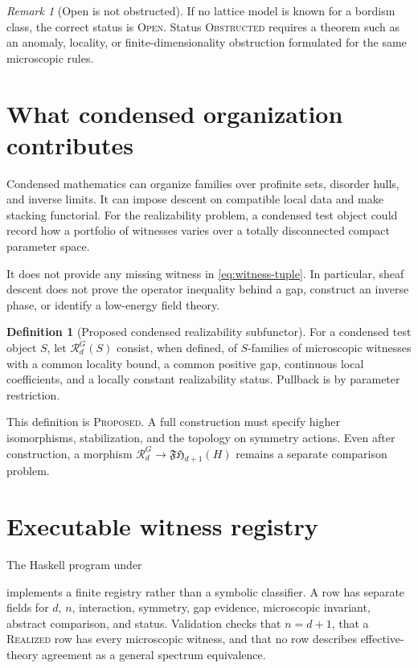 \documentclass[12pt]{article}
\theoremstyle{definition}
\newtheorem{definition}[theorem]{Definition}
\theoremstyle{remark}
\newtheorem{remark}[theorem]{Remark}
\newcommand{\FH}{\mathfrak{FH}}
\newcommand{\REAL}{\textnormal{\textsc{Realized}}}
\newcommand{\PROP}{\textnormal{\textsc{Proposed}}}
\newcommand{\OPEN}{\textnormal{\textsc{Open}}}
\newcommand{\OBST}{\textnormal{\textsc{Obstructed}}}
\begin{document}
\begin{remark}[Open is not obstructed]
If no lattice model is known for a bordism class, the correct status is
\OPEN{}.  Status \OBST{} requires a theorem such as an anomaly, locality, or
finite-dimensionality obstruction formulated for the same microscopic
rules.
\end{remark}

\section{What condensed organization contributes}

Condensed mathematics can organize families over profinite sets, disorder
hulls, and inverse limits.  It can impose descent on compatible local data
and make stacking functorial.  For the realizability problem, a condensed
test object could record how a portfolio of witnesses varies over a totally
disconnected compact parameter space.

It does not provide any missing witness in \cref{eq:witness-tuple}.  In
particular, sheaf descent does not prove the operator inequality behind a
gap, construct an inverse phase, or identify a low-energy field theory.

\begin{definition}[Proposed condensed realizability subfunctor]
For a condensed test object $S$, let $\mathcal R_d^G(S)$ consist, when
defined, of $S$-families of microscopic witnesses with a common locality
bound, a common positive gap, continuous local coefficients, and a locally
constant realizability status.  Pullback is by parameter restriction.
\end{definition}

This definition is \PROP{}.  A full construction must specify higher
isomorphisms, stabilization, and the topology on symmetry actions.  Even
after construction, a morphism
$\mathcal R_d^G\to\FH_{d+1}(H)$ remains a separate comparison problem.

\section{Executable witness registry}

The Haskell program under

\begin{center}
\end{center}

implements a finite registry rather than a symbolic classifier.  A row has
separate fields for $d$, $n$, interaction, symmetry, gap evidence,
microscopic invariant, abstract comparison, and status.  Validation checks
that $n=d+1$, that a \REAL{} row has every microscopic witness, and that no
row describes effective-theory agreement as a general spectrum equivalence.
\end{document}
